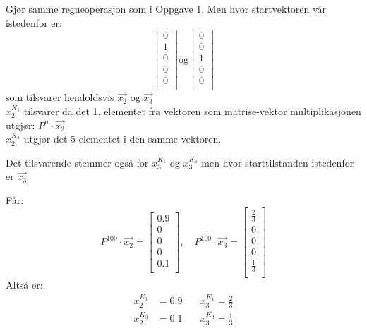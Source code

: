 \documentclass[a4paper, norsk, twoside, 10pt]{article}
\begin{document}
\begin{flushleft}
  Gjør samme regneoperasjon som i Oppgave 1. Men hvor startvektoren vår istedenfor er: \\
  \[\begin{bmatrix}
    0 \\
    1 \\
    0 \\
    0 \\
    0 \\
  \end{bmatrix}
  \textrm{og}
    \begin{bmatrix}
    0 \\
    0 \\
    1 \\
    0 \\
    0 \\
    \end{bmatrix}\]
  som tilsvarer hendoldsvis $\vec{x_{2}}$ og $\vec{x_{3}}$\\
  $x_{2}^{K_{1}}$ tilsvarer da det 1. elementet fra vektoren som matrise-vektor multiplikasjonen utgjør: $P^{n}\cdot \vec{x_{2}}$ \\$x_{2}^{K_{3}}$ utgjør det 5 elementet i den samme vektoren.

  \newpage
  
  Det tilsvarende stemmer også for $x_{3}^{K_{1}}$ og $x_{3}^{K_{3}}$ men hvor starttilstanden istedenfor er $\vec{x_{3}}$

  Får:
  \[ P^{100}\cdot \vec{x_{2}} = \begin{bmatrix}
    0.9 \\
    0 \\
    0 \\
    0 \\
    0.1 \\
  \end{bmatrix}, \quad
  P^{100}\cdot \vec{x_{3}} = \begin{bmatrix}
    \frac{2}{3} \\
    0 \\
    0 \\
    0 \\
    \frac{1}{3} \\
  \end{bmatrix}
  \]
  Altså er:
  \begin{align*} x_{2}^{K_{1}} &= 0.9 \quad &x_{3}^{K_{1}} = \frac{2}{3} \\
    x_{2}^{K_{3}} &= 0.1 \quad &x_{3}^{K_{3}} = \frac{1}{3} \\
  \end{align*}



\end{flushleft}
\end{document}
